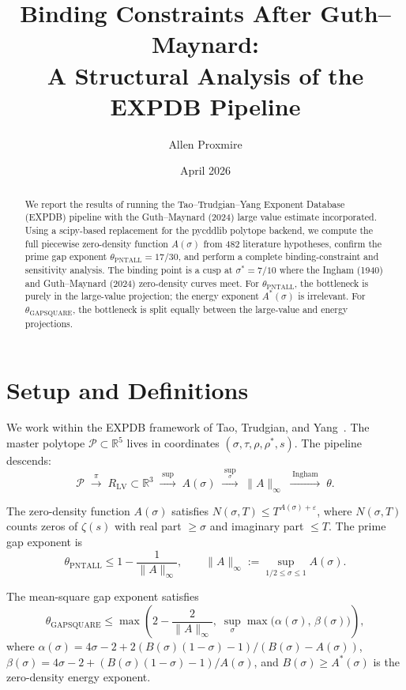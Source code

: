 \documentclass[11pt,a4paper]{article}
\title{Binding Constraints After Guth--Maynard:\\
A Structural Analysis of the EXPDB Pipeline}
\author{Allen Proxmire}
\date{April 2026}
\begin{document}
\maketitle

\begin{abstract}
We report the results of running the Tao--Trudgian--Yang Exponent Database (EXPDB) pipeline with the Guth--Maynard (2024) large value estimate incorporated.  Using a scipy-based replacement for the pycddlib polytope backend, we compute the full piecewise zero-density function $A(\sigma)$ from 482 literature hypotheses, confirm the prime gap exponent $\theta_{\mathrm{PNTALL}} = 17/30$, and perform a complete binding-constraint and sensitivity analysis.  The binding point is a cusp at $\sigma^{*} = 7/10$ where the Ingham (1940) and Guth--Maynard (2024) zero-density curves meet.  For $\theta_{\mathrm{PNTALL}}$, the bottleneck is purely in the large-value projection; the energy exponent $A^{*}(\sigma)$ is irrelevant.  For $\theta_{\mathrm{GAPSQUARE}}$, the bottleneck is split equally between the large-value and energy projections.
\end{abstract}

\section{Setup and Definitions}

We work within the EXPDB framework of Tao, Trudgian, and Yang~\cite{TTY25}.  The master polytope $\mathcal{P} \subset \mathbb{R}^{5}$ lives in coordinates $(\sigma, \tau, \rho, \rho^{*}, s)$.  The pipeline descends:
\[
  \mathcal{P} \;\xrightarrow{\;\pi\;}\; R_{\mathrm{LV}} \subset \mathbb{R}^{3}
  \;\xrightarrow{\;\sup\;}\; A(\sigma)
  \;\xrightarrow{\;\sup_{\sigma}\;}\; \|A\|_{\infty}
  \;\xrightarrow{\;\text{Ingham}\;}\; \theta.
\]

The zero-density function $A(\sigma)$ satisfies $N(\sigma, T) \le T^{A(\sigma) + \varepsilon}$, where $N(\sigma, T)$ counts zeros of $\zeta(s)$ with real part $\ge \sigma$ and imaginary part $\le T$.  The prime gap exponent is
\[
  \theta_{\mathrm{PNTALL}} \le 1 - \frac{1}{\|A\|_{\infty}},
  \qquad
  \|A\|_{\infty} := \sup_{1/2 \le \sigma \le 1} A(\sigma).
\]

The mean-square gap exponent satisfies
\[
  \theta_{\mathrm{GAPSQUARE}} \le \max\!\left(
    2 - \frac{2}{\|A\|_{\infty}},\;
    \sup_{\sigma} \max\bigl(\alpha(\sigma),\, \beta(\sigma)\bigr)
  \right),
\]
where $\alpha(\sigma) = 4\sigma - 2 + 2(B(\sigma)(1-\sigma) - 1)/(B(\sigma) - A(\sigma))$, $\beta(\sigma) = 4\sigma - 2 + (B(\sigma)(1-\sigma) - 1)/A(\sigma)$, and $B(\sigma) \ge A^{*}(\sigma)$ is the zero-density energy exponent.
\end{document}
